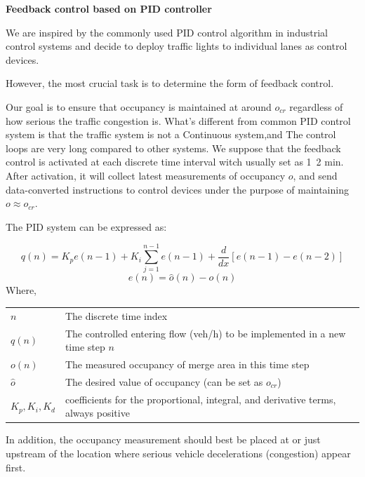 \documentclass{mcmthesis}
\begin{document}
\textbf{Feedback control based on PID controller}

We are inspired by the commonly used PID control algorithm in industrial
control systems and
decide to deploy traffic lights to individual lanes
as control devices.


However, the most crucial task is to determine the
form of feedback control.

Our goal is to ensure that occupancy is maintained
at around $o_{cr}$ regardless of how serious the traffic congestion is.
What's different from common PID control system is that the traffic
system is not a Continuous system,and
The control loops are very long compared to other systems.
We suppose that the feedback control is activated
at each discrete time interval witch usually set as 1~2 min. After activation, it
will collect latest measurements of occupancy $o$, and
send data-converted instructions to control devices
under the purpose of maintaining $o  \approx  o_{cr}$.


The PID system can be expressed as:

  \[q\left( n \right) = K_{p}e\left( {n - 1} \right) + {K_i}\sum_{j=1}^{n-1} e\left( {n - 1} \right)+\frac{d}{dx} \left[ e\left( {n - 1} \right)-e\left( {n - 2} \right)\right]
  \]
  \[
  e\left( {n} \right)=\hat{o}\left( {n} \right)-o\left( {n} \right)
  \]
Where,

\begin{table}[htbp]
  \centering
    \begin{tabular}{ll}
      \toprule
    $n$     & The discrete time index \\
    $q(n)$  & The controlled entering flow (veh/h) to be implemented in a new time step $n$ \\

    $o(n)$ & The measured occupancy of merge area in this time step \\
    $\hat{o}$ & The desired value of occupancy (can be set as $o_{cr}$) \\
    $K_{p},K_i,K_d$  & coefficients for the proportional, integral, and derivative terms, always positive \\
    \bottomrule
    \end{tabular}%
  \label{tab:addlabel}%
\end{table}%

In addition, the occupancy measurement should best be
placed at or just upstream of the location where serious
vehicle decelerations (congestion) appear first.
\end{document}
